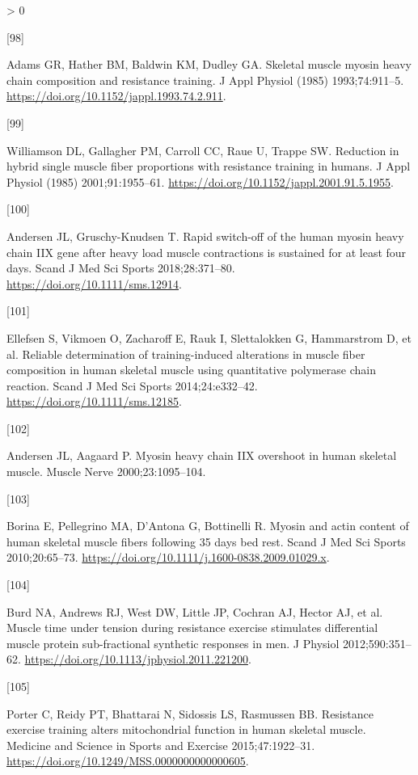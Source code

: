 \documentclass[twoside,10pt]{gihclass} %
\newlength{\cslhangindent}
\newlength{\csllabelwidth}
\newenvironment{CSLReferences}[3] %
 {%
  \setlength{\parindent}{0pt}
  \ifodd #1 \everypar{\setlength{\hangindent}{\cslhangindent}}\ignorespaces\fi
  \ifnum #2 > 0
  \setlength{\parskip}{#2\baselineskip}
  \fi
 }%
 {}
\newcommand{\CSLLeftMargin}[1]{\parbox[t]{\maxof{\widthof{#1}}{\csllabelwidth}}{#1}}
\newcommand{\CSLRightInline}[1]{\parbox[t]{\linewidth}{#1}}
\begin{document}
\begin{CSLReferences}{0}{0}
\leavevmode\hypertarget{ref-RN2220}{}%
\CSLLeftMargin{{[}98{]} }
\CSLRightInline{Adams GR, Hather BM, Baldwin KM, Dudley GA. Skeletal muscle myosin heavy chain composition and resistance training. J Appl Physiol (1985) 1993;74:911--5. \url{https://doi.org/10.1152/jappl.1993.74.2.911}.}

\leavevmode\hypertarget{ref-RN2799}{}%
\CSLLeftMargin{{[}99{]} }
\CSLRightInline{Williamson DL, Gallagher PM, Carroll CC, Raue U, Trappe SW. Reduction in hybrid single muscle fiber proportions with resistance training in humans. J Appl Physiol (1985) 2001;91:1955--61. \url{https://doi.org/10.1152/jappl.2001.91.5.1955}.}

\leavevmode\hypertarget{ref-RN2056}{}%
\CSLLeftMargin{{[}100{]} }
\CSLRightInline{Andersen JL, Gruschy-Knudsen T. Rapid switch-off of the human myosin heavy chain IIX gene after heavy load muscle contractions is sustained for at least four days. Scand J Med Sci Sports 2018;28:371--80. \url{https://doi.org/10.1111/sms.12914}.}

\leavevmode\hypertarget{ref-RN1489}{}%
\CSLLeftMargin{{[}101{]} }
\CSLRightInline{Ellefsen S, Vikmoen O, Zacharoff E, Rauk I, Slettalokken G, Hammarstrom D, et al. Reliable determination of training-induced alterations in muscle fiber composition in human skeletal muscle using quantitative polymerase chain reaction. Scand J Med Sci Sports 2014;24:e332--42. \url{https://doi.org/10.1111/sms.12185}.}

\leavevmode\hypertarget{ref-RN2057}{}%
\CSLLeftMargin{{[}102{]} }
\CSLRightInline{Andersen JL, Aagaard P. Myosin heavy chain IIX overshoot in human skeletal muscle. Muscle Nerve 2000;23:1095--104.}

\leavevmode\hypertarget{ref-RN2108}{}%
\CSLLeftMargin{{[}103{]} }
\CSLRightInline{Borina E, Pellegrino MA, D'Antona G, Bottinelli R. Myosin and actin content of human skeletal muscle fibers following 35 days bed rest. Scand J Med Sci Sports 2010;20:65--73. \url{https://doi.org/10.1111/j.1600-0838.2009.01029.x}.}

\leavevmode\hypertarget{ref-RN1505}{}%
\CSLLeftMargin{{[}104{]} }
\CSLRightInline{Burd NA, Andrews RJ, West DW, Little JP, Cochran AJ, Hector AJ, et al. Muscle time under tension during resistance exercise stimulates differential muscle protein sub-fractional synthetic responses in men. J Physiol 2012;590:351--62. \url{https://doi.org/10.1113/jphysiol.2011.221200}.}

\leavevmode\hypertarget{ref-RN2608}{}%
\CSLLeftMargin{{[}105{]} }
\CSLRightInline{Porter C, Reidy PT, Bhattarai N, Sidossis LS, Rasmussen BB. Resistance exercise training alters mitochondrial function in human skeletal muscle. Medicine and Science in Sports and Exercise 2015;47:1922--31. \url{https://doi.org/10.1249/MSS.0000000000000605}.}


\end{CSLReferences}
\end{document}
